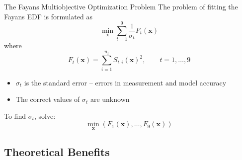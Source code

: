 \documentclass[aspectratio=169]{beamer}
\newcommand{\vx}{\mathbf{x}}
\begin{document}
\begin{frame}{The Fayans Multiobjective Optimization Problem}
The problem of fitting the Fayans EDF is formulated as
$$
\min_{\vx}\sum_{t=1}^9 \frac{1}{\sigma_t}F_t(\vx)
$$
where
$$
F_t(\vx) =  \sum_{i=1}^{n_t} S_{t,i}(\vx)^2,
\qquad t=1,\ldots, 9
$$
\begin{itemize}
\item $\sigma_t$ is the standard error -- errors in
measurement and model accuracy
\item The correct values of $\sigma_t$ are unknown
\end{itemize}
To find $\sigma_t$, solve:
$$\min_{\vx} (F_1(\vx), \ldots, F_9(\vx))$$
\end{frame}

\subsection{Theoretical Benefits}
\end{document}
